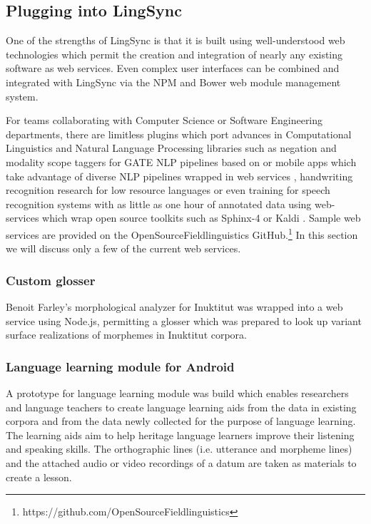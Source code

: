 \documentclass[letterpaper, 12pt, dvips]{mitwpl}
\begin{document}
\subsection{Plugging into LingSync}
\label{sec:plugins}


One of the strengths of LingSync is that it is built using well-understood web technologies which permit the creation and integration of nearly any existing software as web services. 
Even complex user interfaces can be combined and integrated with LingSync via the NPM and Bower web module management system.

For teams collaborating with Computer Science or Software Engineering departments, there are limitless plugins which port advances in Computational Linguistics  and Natural Language Processing libraries  \citep{Chen:2011}  such as negation and modality scope taggers for  GATE \citep{Cunningham:2011} NLP pipelines based on  \citep{Rosenberg:2012} or mobile apps which take advantage of diverse NLP pipelines wrapped in web services \citep{Sateli:2013},
 handwriting recognition research for low resource languages \citep{Sadri:2007} or even training for speech recognition systems with as little as one hour of annotated data using web-services which wrap open source toolkits such as Sphinx-4 \citep{Walker:2004} or Kaldi \citep{Povey:2011}.
Sample web services are provided on the OpenSourceFieldlinguistics GitHub.\footnote{https://github.com/OpenSourceFieldlinguistics} %
In this section we will discuss only a few of the current web services.

\subsubsection{Custom glosser}

 Benoit Farley's \citep{Farley:2014:Online} morphological analyzer for Inuktitut was wrapped into a web service using Node.js, permitting a glosser which was prepared to look up variant  surface realizations of morphemes in Inuktitut corpora.

\subsubsection{Language learning module for Android}

A prototype for language learning module was build which  enables researchers and language teachers to create language learning aids from the data in existing corpora and from the data newly collected for the purpose of language learning.
The learning aids aim to help heritage language learners improve their listening and speaking skills.
The orthographic lines (i.e.
utterance and morpheme lines) and the attached audio or video recordings of a datum are taken as materials to create a lesson.
\end{document}
